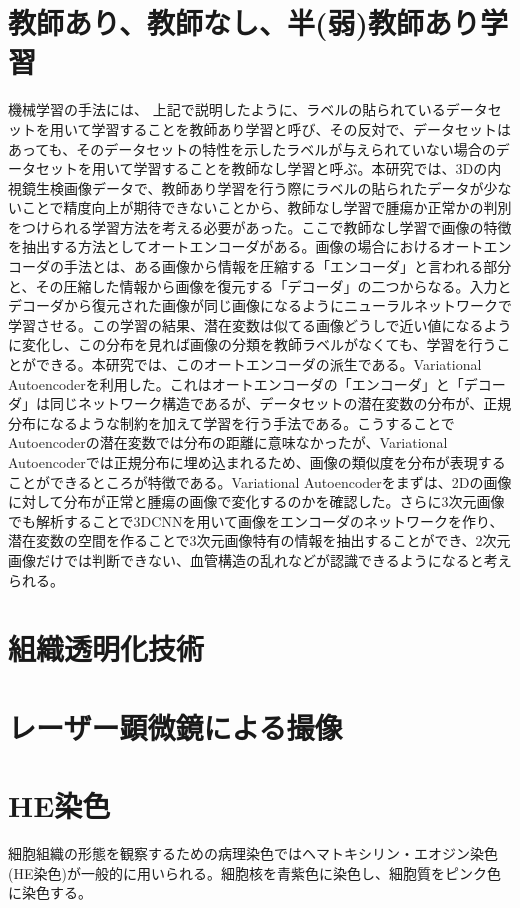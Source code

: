 \documentclass[a4j,10pt,oneside,openany]{jsbook}
\begin{document}
\section{教師あり、教師なし、半(弱)教師あり学習}
機械学習の手法には、
上記で説明したように、ラベルの貼られているデータセットを用いて学習することを教師あり学習と呼び、その反対で、データセットはあっても、そのデータセットの特性を示したラベルが与えられていない場合のデータセットを用いて学習することを教師なし学習と呼ぶ。本研究では、3Dの内視鏡生検画像データで、教師あり学習を行う際にラベルの貼られたデータが少ないことで精度向上が期待できないことから、教師なし学習で腫瘍か正常かの判別をつけられる学習方法を考える必要があった。ここで教師なし学習で画像の特徴を抽出する方法としてオートエンコーダがある。画像の場合におけるオートエンコーダの手法とは、ある画像から情報を圧縮する「エンコーダ」と言われる部分と、その圧縮した情報から画像を復元する「デコーダ」の二つからなる。入力とデコーダから復元された画像が同じ画像になるようにニューラルネットワークで学習させる。この学習の結果、潜在変数は似てる画像どうしで近い値になるように変化し、この分布を見れば画像の分類を教師ラベルがなくても、学習を行うことができる。本研究では、このオートエンコーダの派生である。Variational Autoencoderを利用した。これはオートエンコーダの「エンコーダ」と「デコーダ」は同じネットワーク構造であるが、データセットの潜在変数の分布が、正規分布になるような制約を加えて学習を行う手法である。こうすることでAutoencoderの潜在変数では分布の距離に意味なかったが、Variational Autoencoderでは正規分布に埋め込まれるため、画像の類似度を分布が表現することができるところが特徴である。Variational Autoencoderをまずは、2Dの画像に対して分布が正常と腫瘍の画像で変化するのかを確認した。さらに3次元画像でも解析することで3DCNNを用いて画像をエンコーダのネットワークを作り、潜在変数の空間を作ることで3次元画像特有の情報を抽出することができ、2次元画像だけでは判断できない、血管構造の乱れなどが認識できるようになると考えられる。
\section{組織透明化技術}
\section{レーザー顕微鏡による撮像}
\section{HE染色}
細胞組織の形態を観察するための病理染色ではヘマトキシリン・エオジン染色(HE染色)が一般的に用いられる。細胞核を青紫色に染色し、細胞質をピンク色に染色する。
\end{document}
